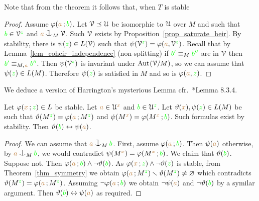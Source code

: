 Note that from the theorem it follows that, when $T$ is stable


\vspace*{-\parskip}
\begin{proof}
  Assume $\varphi({\color{brown} a}\,;{\color{green} b})$.
  Let $\EuScript V\preceq\EuScript U$ be isomorphic to $\EuScript U$ over $M$ and such that ${\color{green} b}\in\EuScript V^{\color{green} z}$ and ${\mr a}\cnonfork_M\V$. Such $\EuScript V$ exists by Proposition~\ref{prop_saturate_heir}.
  By stability, there is $\psi({\color{green} z})\in L(\EuScript V)$ such that $\psi(\EuScript V^{\color{green} z})=\varphi({\color{brown} a},\EuScript V^{\color{green} z})$.
  Recall that by Lemma~\ref{lem_coheir_independence} (non-splitting) if ${\color{green} b'}\equiv_M{\color{green} b''}$ are in $\EuScript V$ then ${\color{green} b'}\equiv_{M,\kern.2ex{\color{brown} a}}{\color{green} b''}$.
  Then $\psi(\EuScript V^{\color{green} z})$ is invariant under ${\rm Aut\kern.15ex}(\EuScript V/M)$, so we can assume that $\psi({\color{green} z})\in L(M)$.
  Therefore $\psi({\color{green} z})$ is satisfied in $M$ and so is $\varphi({\color{brown} a},{\color{green} z})$.
\end{proof}

We deduce a version of Harrington's mysterious Lemma cfr.~\cite{TZ}*{Lemma 8.3.4}.

\begin{corollary}\label{corol_harrington0}
  Let $\varphi({\color{brown} x}\,;{\color{green} z})\in L$ be stable.
  Let ${\color{brown} a}\in\EuScript U^{\color{brown} x}$ and ${\color{green} b}\in\EuScript U^{\color{green} z}$.
  Let $\vartheta({\color{brown} x}),\psi({\color{green} z})\in L(M)$ be such that $\vartheta(M^{\color{green} z})=\varphi({\color{brown} a}\,;M^{\color{green} z})$ and $\psi(M^{\color{brown} x})=\varphi(M^{\color{brown} x}\,;{\color{green} b})$.
  Such formulas exist by stability.
  Then $\vartheta({\color{green} b})\leftrightarrow\psi({\color{brown} a})$.
\end{corollary}

\begin{proof}
  We can assume that ${\mr a}\cnonfork_M{\gr b}$.
  First, assume $\varphi({\color{brown} a}\,;{\color{green} b})$.
  Then $\psi({\color{brown} a})$ otherwise, by ${\mr a}\cnonfork_M{\gr b}$, we would contradict $\psi(M^{\color{brown} x})=\varphi(M^{\color{brown} x}\,;{\color{green} b})$.
  We claim that $\vartheta({\color{green} b})$.
  Suppose not.
  Then $\varphi({\color{brown} a}\,;{\color{green} b})\wedge\neg\vartheta({\color{green} b})$.
  As $\varphi({\color{brown} x}\,;{\color{green} z})\wedge\neg\vartheta({\color{green} z})$ is stable, from Theorem~\ref{thm_symmetry} we obtain $\varphi({\color{brown} a}\,;M^{\color{green} z})\smallsetminus\vartheta(M^{\color{green} z})\neq\varnothing$ which contradicts  $\vartheta(M^{\color{green} z})=\varphi({\color{brown} a}\,;M^{\color{green} z})$.
  Assuming $\neg\varphi({\color{brown} a}\,;{\color{green} b})$ we obtain $\neg\psi({\color{brown} a})$ and $\neg\vartheta({\color{green} b})$ by a symilar argument.
  Then $\vartheta({\color{green} b})\leftrightarrow\psi({\color{brown} a})$ as required.
\end{proof}

